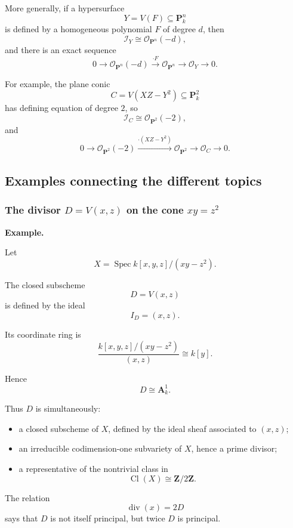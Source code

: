 More generally, if a hypersurface
\[
Y=V(F)\subseteq\mathbf P^n_k
\]
is defined by a homogeneous polynomial \(F\) of degree \(d\), then
\[
\mathcal I_Y\cong\mathcal O_{\mathbf P^n}(-d),
\]
and there is an exact sequence
\[
0
\longrightarrow
\mathcal O_{\mathbf P^n}(-d)
\xrightarrow{\cdot F}
\mathcal O_{\mathbf P^n}
\longrightarrow
\mathcal O_Y
\longrightarrow
0.
\]

For example, the plane conic
\[
C=V(XZ-Y^2)\subseteq\mathbf P^2_k
\]
has defining equation of degree \(2\), so
\[
\mathcal I_C\cong\mathcal O_{\mathbf P^2}(-2),
\]
and
\[
0
\longrightarrow
\mathcal O_{\mathbf P^2}(-2)
\xrightarrow{\cdot(XZ-Y^2)}
\mathcal O_{\mathbf P^2}
\longrightarrow
\mathcal O_C
\longrightarrow
0.
\]

\subsection{Examples connecting the different topics}

\subsubsection{\texorpdfstring{The divisor \(D=V(x,z)\) on the cone \(xy=z^2\)}{A divisor on the quadric cone}}

\textbf{Example.}

Let
\[
X=\operatorname{Spec}k[x,y,z]/(xy-z^2).
\]

The closed subscheme
\[
D=V(x,z)
\]
is defined by the ideal
\[
I_D=(x,z).
\]

Its coordinate ring is
\[
\frac{k[x,y,z]/(xy-z^2)}{(x,z)}
\cong
k[y].
\]

Hence
\[
D\cong\mathbf A^1_k.
\]

Thus \(D\) is simultaneously:

\begin{itemize}
	\item a closed subscheme of \(X\), defined by the ideal sheaf associated to \((x,z)\);
	\item an irreducible codimension-one subvariety of \(X\), hence a prime divisor;
	\item a representative of the nontrivial class in
	\[
	\operatorname{Cl}(X)\cong\mathbf Z/2\mathbf Z.
	\]
\end{itemize}

The relation
\[
\operatorname{div}(x)=2D
\]
says that \(D\) is not itself principal, but twice \(D\) is principal.

